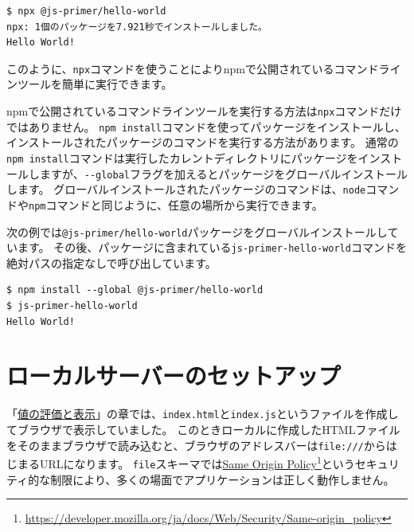 \begin{lstlisting}
$ npx @js-primer/hello-world
npx: 1個のパッケージを7.921秒でインストールしました。
Hello World!
\end{lstlisting}

このように、\texttt{npx}コマンドを使うことによりnpmで公開されているコマンドラインツールを簡単に実行できます。

\begin{tcolorbox}[title=コマンドラインツールのインストールと実行]\label{command-line-tools-installation}

npmで公開されているコマンドラインツールを実行する方法は\texttt{npx}コマンドだけではありません。
\texttt{npm install}コマンドを使ってパッケージをインストールし、インストールされたパッケージのコマンドを実行する方法があります。
通常の\texttt{npm install}コマンドは実行したカレントディレクトリにパッケージをインストールしますが、\texttt{-\/-global}フラグを加えるとパッケージをグローバルインストールします。
グローバルインストールされたパッケージのコマンドは、\texttt{node}コマンドや\texttt{npm}コマンドと同じように、任意の場所から実行できます。

次の例では\texttt{@js-primer/hello-world}パッケージをグローバルインストールしています。
その後、パッケージに含まれている\texttt{js-primer-hello-world}コマンドを絶対パスの指定なしで呼び出しています。

\begin{lstlisting}
$ npm install --global @js-primer/hello-world
$ js-primer-hello-world
Hello World!
\end{lstlisting}
\end{tcolorbox}

\hypertarget{local-server}{%
\section{ローカルサーバーのセットアップ}\label{local-server}}

「\hyperlink{read-eval-print}{値の評価と表示}」の章では、\texttt{index.html}と\texttt{index.js}というファイルを作成してブラウザで表示していました。
このときローカルに作成したHTMLファイルをそのままブラウザで読み込むと、ブラウザのアドレスバーは\texttt{file:///}からはじまるURLになります。
\texttt{file}スキーマでは\href{https://developer.mozilla.org/ja/docs/Web/Security/Same-origin_policy}{Same Origin
Policy}\footnote{\url{https://developer.mozilla.org/ja/docs/Web/Security/Same-origin_policy}}というセキュリティ的な制限により、多くの場面でアプリケーションは正しく動作しません。

